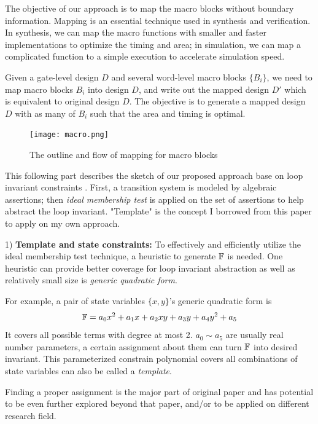 \begin{Problem}
The objective of our approach is to map the macro blocks without boundary information.
Mapping is an essential technique used in synthesis and verification. In synthesis, we can map the 
macro functions with smaller and faster implementations to optimize the timing and area; in simulation,
we can map a complicated function to a simple execution to accelerate simulation speed.

Given a gate-level design $D$ and several word-level macro blocks $\{B_i\}$, we need to map macro
blocks $B_i$ into design $D$, and write out the mapped design $D'$ which is equivalent to original
design $D$. The objective is to generate a mapped design $D$ with as many of $B_i$ such that the area
and timing is optimal. 

\begin{figure}[hbt]
	\begin{center}
	\texttt{[image: macro.png]}
	\end{center}
	\caption{The outline and flow of mapping for macro blocks}
	\label{fig:macro}
\end{figure}

\end{Problem}

This following part describes the sketch of our proposed approach base on loop invariant constraints \cite{sankaranarayanan2004non}.
First, a transition system is modeled by algebraic assertions; then \emph{ideal membership test}
is applied on the set of assertions to help abstract the loop invariant. "Template" is the concept
I borrowed from this paper to apply on my own approach.

1) {\bf Template and state constraints:} To effectively and efficiently utilize the ideal membership test technique, a heuristic to
generate ${\mathbb{F}}$ is needed. One heuristic can provide better coverage for loop invariant abstraction as well as
relatively small size is \emph{generic quadratic form}.

For example, a pair of state variables $\{x,y\}$'s generic quadratic form is
$${\mathbb{F}} = a_0x^2+a_1x+a_2xy+a_3y+a_4y^2+a_5$$
It covers all possible terms with degree at most 2. $a_0\sim a_5$ are usually real number parameters,
a certain assignment about them can turn ${\mathbb{F}}$ into desired invariant. This parameterized constrain
polynomial covers all combinations of state variables can also be called a \emph{template}.

Finding a proper assignment is the major part of original paper and has potential to be even further explored
beyond that paper, and/or to be applied on different research field.

